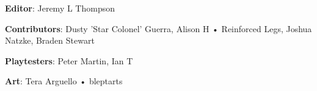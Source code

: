 \begin{description}

\item {\bfseries Editor}: Jeremy L Thompson

\item {\bfseries Contributors}: Dusty 'Star Colonel' Guerra, Alison H • Reinforced Legs, Joshua Natzke, Braden Stewart

\item {\bfseries Playtesters}: Peter Martin, Ian T

\item {\bfseries Art}: Tera Arguello • bleptarts

\end{description}
